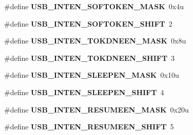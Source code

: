 \begin{DoxyCompactItemize}
\item 
\#define {\bfseries U\+S\+B\+\_\+\+I\+N\+T\+E\+N\+\_\+\+S\+O\+F\+T\+O\+K\+E\+N\+\_\+\+M\+A\+SK}~0x4u\hypertarget{group__USB__Register__Masks_ga6398aff7e3278bea66900a35b616563f}{}\label{group__USB__Register__Masks_ga6398aff7e3278bea66900a35b616563f}

\item 
\#define {\bfseries U\+S\+B\+\_\+\+I\+N\+T\+E\+N\+\_\+\+S\+O\+F\+T\+O\+K\+E\+N\+\_\+\+S\+H\+I\+FT}~2\hypertarget{group__USB__Register__Masks_ga8d9738dcc6d852ffd09dbac5e8058431}{}\label{group__USB__Register__Masks_ga8d9738dcc6d852ffd09dbac5e8058431}

\item 
\#define {\bfseries U\+S\+B\+\_\+\+I\+N\+T\+E\+N\+\_\+\+T\+O\+K\+D\+N\+E\+E\+N\+\_\+\+M\+A\+SK}~0x8u\hypertarget{group__USB__Register__Masks_ga59b367a1e2496ad06deee9d86001aa7d}{}\label{group__USB__Register__Masks_ga59b367a1e2496ad06deee9d86001aa7d}

\item 
\#define {\bfseries U\+S\+B\+\_\+\+I\+N\+T\+E\+N\+\_\+\+T\+O\+K\+D\+N\+E\+E\+N\+\_\+\+S\+H\+I\+FT}~3\hypertarget{group__USB__Register__Masks_ga2e0c8229886bcca7e35bee00cd90d236}{}\label{group__USB__Register__Masks_ga2e0c8229886bcca7e35bee00cd90d236}

\item 
\#define {\bfseries U\+S\+B\+\_\+\+I\+N\+T\+E\+N\+\_\+\+S\+L\+E\+E\+P\+E\+N\+\_\+\+M\+A\+SK}~0x10u\hypertarget{group__USB__Register__Masks_gac2cf7613141a7333e152b43e42e6ee53}{}\label{group__USB__Register__Masks_gac2cf7613141a7333e152b43e42e6ee53}

\item 
\#define {\bfseries U\+S\+B\+\_\+\+I\+N\+T\+E\+N\+\_\+\+S\+L\+E\+E\+P\+E\+N\+\_\+\+S\+H\+I\+FT}~4\hypertarget{group__USB__Register__Masks_ga8e3c25dd5e743c21fc277d45640d5a5e}{}\label{group__USB__Register__Masks_ga8e3c25dd5e743c21fc277d45640d5a5e}

\item 
\#define {\bfseries U\+S\+B\+\_\+\+I\+N\+T\+E\+N\+\_\+\+R\+E\+S\+U\+M\+E\+E\+N\+\_\+\+M\+A\+SK}~0x20u\hypertarget{group__USB__Register__Masks_ga9bcc213c102e47e0700cd463b9198470}{}\label{group__USB__Register__Masks_ga9bcc213c102e47e0700cd463b9198470}

\item 
\#define {\bfseries U\+S\+B\+\_\+\+I\+N\+T\+E\+N\+\_\+\+R\+E\+S\+U\+M\+E\+E\+N\+\_\+\+S\+H\+I\+FT}~5\hypertarget{group__USB__Register__Masks_ga49c43d3fce5392a3d68780ebd02cb5df}{}\label{group__USB__Register__Masks_ga49c43d3fce5392a3d68780ebd02cb5df}


\end{DoxyCompactItemize}
